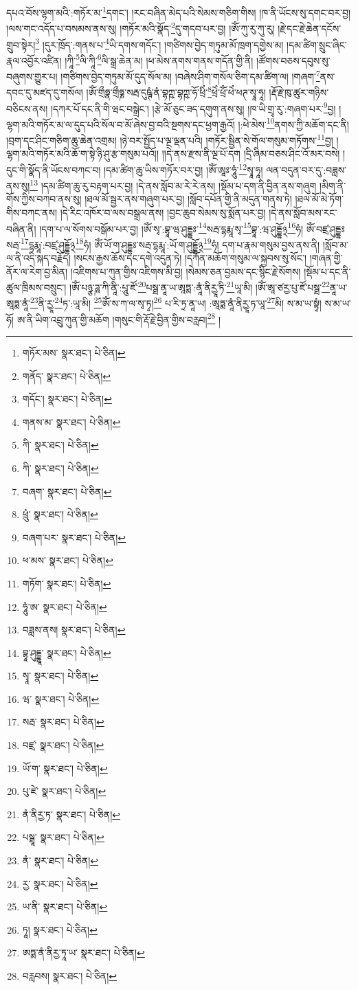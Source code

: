 དཔའ་བོས་ལྷག་མའི་:གཏོར་མ་\footnote{གཏོར་མས་  སྣར་ཐང་།  པེ་ཅིན། }དགང་། །རང་བཞིན་མེད་པའི་སེམས་གཅིག་གིས། །ཁ་ནི་ཡོངས་སུ་དགང་བར་བྱ། །ལས་གང་འདོད་པ་བསམས་ནས་སུ། །གཏོར་མའི་སྣོད་\footnote{གནོད་  སྣར་ཐང་།  པེ་ཅིན། }དུ་གདབ་པར་བྱ། །ཨོཾ་ཀུ་རུ་ཀུ་རུ། །རྗེ་དང་རྗེ་ཆེན་དངོས་གྲུབ་སྟེར།\footnote{གདོང་།  སྣར་ཐང་།  པེ་ཅིན། } །དུར་ཁྲོད་:གནས་པ་\footnote{གནས་མ་  སྣར་ཐང་།  པེ་ཅིན། }ཡི་དགས་གདོང་། །གཙིགས་བྱེད་གཏུམ་མོ་ཁྲག་དགྱེས་མ། །དམ་ཚིག་སྲུང་ཞིང་རྣལ་འབྱོར་འཛིན། །ཀཱི་\footnote{ཀི་  སྣར་ཐང་།  པེ་ཅིན། }ལི་ཀཱི་\footnote{ཀི་  སྣར་ཐང་།  པེ་ཅིན། }ལི་སྒྲ་ཆེན་མ། །ཕ་མེས་ནགས་གནས་གདོན་གྱི་ནི། །ཚོགས་བཅས་དབུས་སུ་བཞུགས་གྱུར་པ། །གཙིགས་བྱེད་གཏུམ་མོ་དུད་སོལ་མ། །བཞེས་ཤིག་གསོལ་ཅིག་དམ་ཚིག་ལ། །གཞག་\footnote{བཞག་  སྣར་ཐང་།  པེ་ཅིན། }ནས་དབང་དུ་མཛད་དུ་གསོལ། །ཨོཾ་གྲྀཧྣ་གྲྀཧྞ་སརྦ་དུཥྚཾ་ནཾ་བྷཀྵ་བྷཀྵ་ཧོ་ཕྲིཾ་\footnote{ཕྲུཾ་  སྣར་ཐང་།  པེ་ཅིན། }ཕྲེཾ་ཕྲོཾ་ཕེཾ་ཕཊ་སྭཱ་ཧཱ། །རྡོ་རྗེ་ཁུ་ཚུར་གཉིས་བཅིངས་ནས། །དཀར་པོ་དང་ནི་གི་ཝང་བསྒྲེང་། །རྩེ་མོ་ཅུང་ཟད་དགུག་ནས་སུ། །ཁ་ཡི་གྲྭ་རུ་:གཞག་པར་\footnote{བཞག་པར་  སྣར་ཐང་།  པེ་ཅིན། }བྱ། །ལྷག་མའི་གཏོར་མ་ལ་དུད་པའི་སོལ་བ་མོ་ཞེས་བྱ་བའི་སྔགས་དང་ཕྱག་རྒྱའོ། །:ཕེ་མེས་\footnote{ཕ་མས་  སྣར་ཐང་།  པེ་ཅིན། }ནགས་ཀྱི་མཆོག་དང་ནི། །བྲག་དང་ཤིང་གཅིག་ཆུ་ཆེན་འགྲམ། །ཉེ་བར་སྤྱོད་པ་ལྔ་ལྡན་པའི། །གཏོར་སྦྱིན་སེ་གོལ་གསུམ་གཏོགས་\footnote{གཏོག་  སྣར་ཐང་།  པེ་ཅིན། }བྱ། །ལྷག་མའི་གཏོར་མའི་ཆོ་ག་སྟེ་ཉི་ཤུ་རྩ་གསུམ་པའོ།། །།དེ་ནས་རྫས་ནི་ལྔ་པོ་དག །དྲི་ཞིམ་བཅས་ཤིང་འོ་མར་བསེ། །དུང་གི་སྣོད་ནི་ཡོངས་བཀང་བ། །དམ་ཚིག་ཆུ་ཡིས་གཏོར་བར་བྱ། །ཨོཾ་ཨཱཿ་ཧཱུཾ་\footnote{ཧཱུཾ་ཨ་  སྣར་ཐང་།  པེ་ཅིན། }སྭཱ་ཧཱ། ལན་བདུན་བར་དུ་:བཟླས་ནས་སུ།\footnote{བཟླས་ནས།  སྣར་ཐང་།  པེ་ཅིན། } །དམ་ཚིག་ཆུ་རུ་བརྟག་པར་བྱ། །དེ་ནས་སློབ་མ་རེ་རེ་ནས། །སྡོམ་པ་དག་ནི་བྱིན་ནས་གཞུག །མིག་ནི་གོས་ཀྱིས་བཀབ་ནས་སུ། །ཐལ་མོ་སྦྱར་ནས་གཞུག་པར་བྱ། །སློབ་དཔོན་གྱི་ནི་མདུན་གནས་ཏེ། །ཐལ་མོ་མེ་ཏོག་གིས་བཀང་ནས། །དེ་རིང་འཁོར་བ་ལས་བསྒྲལ་ནས། །བྱང་ཆུབ་སེམས་སུ་སྨོན་པར་བྱ། །དེ་ནས་སློབ་མས་རང་བཞིན་ནི། །དག་པ་ལ་སོགས་བསྒོམ་པར་བྱ། །ཨོཾ་སྭ་:བྷཱ་ཝ་ཤུདྡྷཿ་\footnote{བྷཱ་ཤུདྡྷཱ་  སྣར་ཐང་།  པེ་ཅིན། }སརྦ་དྷརྨཱ་སྭ་\footnote{སྭཱ་  སྣར་ཐང་།  པེ་ཅིན། }བྷཱ་:ཝ་ཤུདྡྷོ྅\footnote{ཝ་  སྣར་ཐང་།  པེ་ཅིན། }ཧཾ། ཨོཾ་བཛྲ་ཤུདྡྷཿསརྦ་\footnote{སརྦ་  སྣར་ཐང་།  པེ་ཅིན། }དྷརྨཱ་:བཛྲ་ཤུདྡྷོ྅\footnote{བཛྲ་  སྣར་ཐང་།  པེ་ཅིན། }ཧཾ། ཨོཾ་ཡོ་ག་ཤུདྡྷཿ་སརྦ་དྷརྨཱ་:ཡོ་ག་ཤུདྡྷོ྅\footnote{ཡོ་ག་  སྣར་ཐང་།  པེ་ཅིན། }ཧཾ། དག་པ་རྣམ་གསུམ་བྱས་ནས་ནི། །སློབ་མ་ལ་ནི་འདི་སྐད་བརྗོད། །སངས་རྒྱས་ཆོས་དང་དགེ་འདུན་ཏེ། །དཀོན་མཆོག་གསུམ་ལ་སྐྱབས་སུ་སོང་། །གཞན་གྱི་ནོར་ལ་རེག་བྱ་མིན། །འཇིགས་པ་ཀུན་གྱིས་འཇིགས་མི་བྱ། །སེམས་ཅན་བྱམས་དང་སྙིང་རྗེ་སོགས། །སྡོམ་པ་དང་ནི་ཚུལ་ཁྲིམས་བསྲུང་། །ཨོཾ་པཉྩ་ཌཱ་ཀི་ནཱི་:པཱུ་ཛོ་\footnote{པུ་ཛེ་  སྣར་ཐང་།  པེ་ཅིན། }པསྠ་ནཱ་ཡ་ཨཱཏྨ་:ནཱཾ་ནིརྱཱ་ཏི་\footnote{ནཾ་ནིརྱ་ཏ་  སྣར་ཐང་།  པེ་ཅིན། }ཡཱ་མི། །ཨོཾ་ཨཱ་ཙརྱ་པུ་ཛོ་པསྠ་\footnote{པསྠཱ་  སྣར་ཐང་།  པེ་ཅིན། }ནཱ་ཡ་ཨཱཏྨ་ནཱཾ་\footnote{ནཾ་  སྣར་ཐང་།  པེ་ཅིན། }ནི་རྱཱ་\footnote{རྱ་  སྣར་ཐང་།  པེ་ཅིན། }ཏ་:ཡཱ་མི། \footnote{ཡ་ནི་  སྣར་ཐང་།  པེ་ཅིན། }ཨོཾ་ས་ཀ་ལ་སྭ་ཏྭ།\footnote{ཏཱ།  སྣར་ཐང་།  པེ་ཅིན། } པ་རི་ཏྲ་ནཱ་ཡ། :ཨཱཏྨ་ནཱཾ་ནིརྱཱ་ཏ་ཡཱ་\footnote{ཨཏྨ་ནཾ་ནིརྱ་ཏཱ་ཡ་  སྣར་ཐང་།  པེ་ཅིན། }མི། ས་མ་ཡ་སྟྭཾ། ས་མ་ཡ་ཧོ། ཨ་ནི་ཡིག་འབྲུ་ཀུན་གྱི་མཆོག །གསུང་གི་རྡོ་རྗེ་བྱིན་གྱིས་བརླབ།\footnote{བརླབས།  སྣར་ཐང་།  པེ་ཅིན། } །
